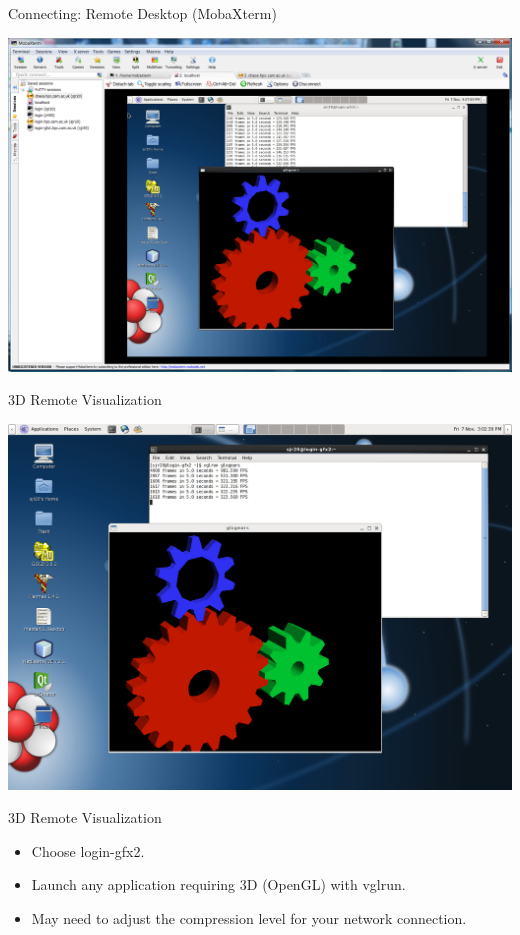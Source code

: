 \begin{frame}{Connecting: Remote Desktop (MobaXterm)}
\begin{center}
\includegraphics[height=0.8\textheight]{imgs/mobaxterm-vgl-turbovnc.png}
\end{center}
\end{frame}

\begin{frame}{3D Remote Visualization}
\begin{center}
\includegraphics[height=0.8\textheight]{imgs/vgl-turbovnc.png}
\end{center}
\end{frame}

\begin{frame}{3D Remote Visualization}
\begin{itemize}
\item{Choose \alert{login-gfx2}.}
\item{Launch any application requiring 3D (OpenGL) with \alert{vglrun}.}
\item{May need to adjust the compression level for your network connection.}
\end{itemize}
\end{frame}